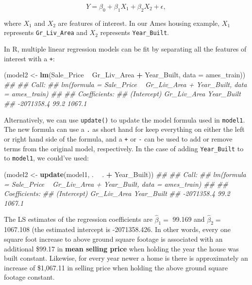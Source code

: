 \documentclass[]{krantz}
\makeatletter
\newenvironment{Shaded}{\begin{snugshade}}{\end{snugshade}}
\newcommand{\CommentTok}[1]{\textcolor[rgb]{0.37,0.37,0.37}{\textit{#1}}}
\newcommand{\DataTypeTok}[1]{\textcolor[rgb]{0.27,0.27,0.27}{#1}}
\newcommand{\KeywordTok}[1]{\textcolor[rgb]{0.27,0.27,0.27}{\textbf{#1}}}
\newcommand{\NormalTok}[1]{#1}
\newcommand{\OperatorTok}[1]{\textcolor[rgb]{0.43,0.43,0.43}{\textbf{#1}}}
\newcommand{\StringTok}[1]{\textcolor[rgb]{0.5,0.5,0.5}{#1}}
\newenvironment{kframe}{%
\medskip{}
\setlength{\fboxsep}{.8em}
 \def\at@end@of@kframe{}%
 \ifinner\ifhmode%
  \def\at@end@of@kframe{\end{minipage}}%
  \begin{minipage}{\columnwidth}%
 \fi\fi%
 \def\FrameCommand##1{\hskip\@totalleftmargin \hskip-\fboxsep
 \colorbox{shadecolor}{##1}\hskip-\fboxsep
     \hskip-\linewidth \hskip-\@totalleftmargin \hskip\columnwidth}%
 \MakeFramed {\advance\hsize-\width
   \@totalleftmargin\z@ \linewidth\hsize
   \@setminipage}}%
 {\par\unskip\endMakeFramed%
 \at@end@of@kframe}
\renewenvironment{Shaded}{\begin{kframe}}{\end{kframe}}
\makeatother
\begin{document}
\begin{equation}
  Y = \beta_0 + \beta_1 X_1 + \beta_2 X_2 + \epsilon,
\end{equation}

where \(X_1\) and \(X_2\) are features of interest. In our Ames housing example, \(X_1\) represents \texttt{Gr\_Liv\_Area} and \(X_2\) represents \texttt{Year\_Built}.

In R, multiple linear regression models can be fit by separating all the features of interest with a \texttt{+}:

\begin{Shaded}
\begin{Highlighting}[]
\NormalTok{(model2 <-}\StringTok{ }\KeywordTok{lm}\NormalTok{(Sale_Price }\OperatorTok{~}\StringTok{ }\NormalTok{Gr_Liv_Area }\OperatorTok{+}\StringTok{ }\NormalTok{Year_Built, }\DataTypeTok{data =}\NormalTok{ ames_train))}
\CommentTok{## }
\CommentTok{## Call:}
\CommentTok{## lm(formula = Sale_Price ~ Gr_Liv_Area + Year_Built, data = ames_train)}
\CommentTok{## }
\CommentTok{## Coefficients:}
\CommentTok{## (Intercept)  Gr_Liv_Area   Year_Built  }
\CommentTok{##  -2071358.4         99.2       1067.1}
\end{Highlighting}
\end{Shaded}

Alternatively, we can use \texttt{update()} to update the model formula used in \texttt{model1}. The new formula can use a \texttt{.} as short hand for keep everything on either the left or right hand side of the formula, and a \texttt{+} or \texttt{-} can be used to add or remove terms from the original model, respectively. In the case of adding \texttt{Year\_Built} to to \texttt{model1}, we could've used:

\begin{Shaded}
\begin{Highlighting}[]
\NormalTok{(model2 <-}\StringTok{ }\KeywordTok{update}\NormalTok{(model1, . }\OperatorTok{~}\StringTok{ }\NormalTok{. }\OperatorTok{+}\StringTok{ }\NormalTok{Year_Built))}
\CommentTok{## }
\CommentTok{## Call:}
\CommentTok{## lm(formula = Sale_Price ~ Gr_Liv_Area + Year_Built, data = ames_train)}
\CommentTok{## }
\CommentTok{## Coefficients:}
\CommentTok{## (Intercept)  Gr_Liv_Area   Year_Built  }
\CommentTok{##  -2071358.4         99.2       1067.1}
\end{Highlighting}
\end{Shaded}

The LS estimates of the regression coefficients are \(\widehat{\beta}_1 =\) 99.169 and \(\widehat{\beta}_2 =\) 1067.108 (the estimated intercept is -2071358.426. In other words, every one square foot increase to above ground square footage is associated with an additional \$99.17 in \textbf{mean selling price} when holding the year the house was built constant. Likewise, for every year newer a home is there is approximately an increase of \$1,067.11 in selling price when holding the above ground square footage constant.
\end{document}
